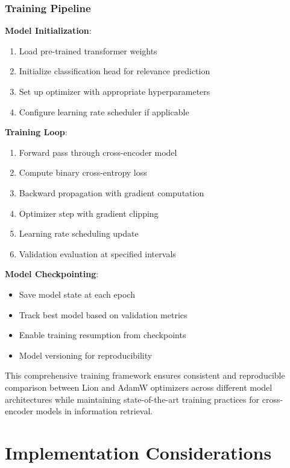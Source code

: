 \subsubsection{Training Pipeline}

\textbf{Model Initialization}:
\begin{enumerate}
    \item Load pre-trained transformer weights
    \item Initialize classification head for relevance prediction
    \item Set up optimizer with appropriate hyperparameters
    \item Configure learning rate scheduler if applicable
\end{enumerate}

\textbf{Training Loop}:
\begin{enumerate}
    \item Forward pass through cross-encoder model
    \item Compute binary cross-entropy loss
    \item Backward propagation with gradient computation
    \item Optimizer step with gradient clipping
    \item Learning rate scheduling update
    \item Validation evaluation at specified intervals
\end{enumerate}

\textbf{Model Checkpointing}:
\begin{itemize}
    \item Save model state at each epoch
    \item Track best model based on validation metrics
    \item Enable training resumption from checkpoints
    \item Model versioning for reproducibility
\end{itemize}

This comprehensive training framework ensures consistent and reproducible comparison between Lion and AdamW optimizers across different model architectures while maintaining state-of-the-art training practices for cross-encoder models in information retrieval.


\section{Implementation Considerations}

